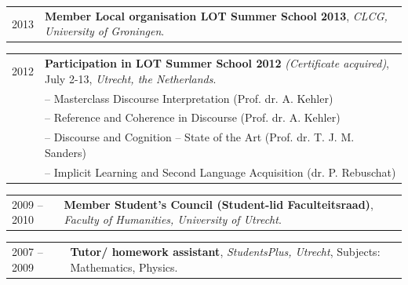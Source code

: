 \documentclass[a4paper,10pt]{article}
\def\leftcolwidth{.12\textwidth}
\def\tablevspace{10pt}
\begin{document}
\vspace{\tablevspace}

\noindent
\begin{tabularx}{\textwidth}{ p{\leftcolwidth} X }
  2013
  & \textbf{Member Local organisation LOT Summer School 2013},
    \textit{CLCG, University of Groningen}.\\
\end{tabularx}

\vspace{\tablevspace}

\noindent
\begin{tabularx}{\textwidth}{ p{\leftcolwidth} X }
  2012 & \textbf{Participation in LOT Summer School 2012} 
         \textit{(Certificate acquired)}, July 2-13,
         \textit{Utrecht, the Netherlands}.\\
       & -- {Masterclass Discourse Interpretation} (Prof. dr. A. Kehler)\\
       & -- {Reference and Coherence in Discourse} (Prof. dr. A. Kehler)\\
       & -- {Discourse and Cognition -- State of the Art} (Prof. dr. T. J. M. Sanders)\\
       & -- {Implicit Learning and Second Language Acquisition}
         (dr. P. Rebuschat)\\
\end{tabularx}

\vspace{\tablevspace}

\noindent
\begin{tabularx}{\textwidth}{ p{\leftcolwidth} X }
  2009 -- 2010
  & \textbf{Member Student's Council (Student-lid Faculteitsraad)},
    \textit{Faculty of Humanities, University of Utrecht}.\\
\end{tabularx}

\vspace{\tablevspace}

%

\noindent
\begin{tabularx}{\textwidth}{ p{\leftcolwidth} X }
  2007 -- 2009
  & \textbf{Tutor/ homework assistant}, \textit{StudentsPlus, Utrecht},
  Subjects: Mathematics, Physics.
\end{tabularx}
\end{document}

